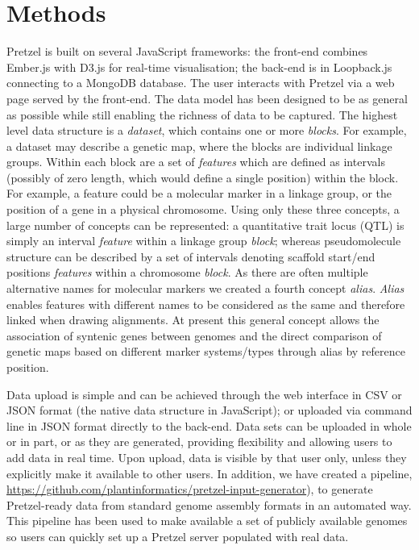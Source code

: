 \section{Methods}

Pretzel is built on several JavaScript frameworks: the front-end combines Ember.js with D3.js
  for real-time visualisation; the back-end is in Loopback.js connecting to a MongoDB database. 
%
The user interacts with Pretzel via a web page served by the front-end. 
%
The data model has been designed to be as general as possible while still enabling the richness of
  data to be captured. 
%
  The highest level data structure is a \textit{dataset}, which contains one or more \textit{blocks}.
%
For example, a dataset may describe a genetic map, where the blocks are individual linkage groups. 
%
  Within each block are a set of \textit{features} which are defined as intervals (possibly of zero length,
  which would define a single position) within the block. 
%
For example, a feature could be a molecular marker in a linkage group, or the position of a gene in
  a physical chromosome. 
%
Using only these three concepts, a large number of concepts can be represented: a quantitative trait locus
  (QTL) is simply an interval \textit{feature} within a linkage group \textit{block}; whereas pseudomolecule structure can be described by a
  set of intervals denoting scaffold start/end positions \textit{features} within a chromosome \textit{block}. 
%
As there are often multiple alternative names for molecular markers we created a fourth concept \textit{alias}. 
\textit{Alias} enables features with different names to be considered as the same and therefore linked when drawing alignments. 
%
At present this general concept allows the association of syntenic genes between genomes and the direct comparison of genetic maps
  based on different marker systems/types through alias by reference position.

Data upload is simple and can be achieved through the web interface in CSV or JSON format (the native data structure in
  JavaScript); or uploaded via command line in JSON format directly to the back-end. 
%
Data sets can be uploaded in whole or in part, or as they are generated, providing flexibility and allowing users to add data in real time.
%
Upon upload, data is visible by that user only, unless they explicitly make it available to other users. 
%
In addition, we have created a pipeline, 
  \href{https://github.com/plantinformatics/pretzel-input-generator}{https://github.com/plantinformatics/pretzel-input-generator}), 
  to generate Pretzel-ready data
  from standard genome assembly formats in an automated way. This pipeline has been used to make
  available a set of publicly available genomes so users can quickly set up a Pretzel server
  populated with real data.

